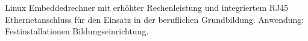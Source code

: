 
Linux Embeddedrechner mit erhöhter Rechenleistung und integriertem RJ45 Ethernetanschluss für den Einsatz in der beruflichen Grundbildung.
Anwendung: Festinstallationen Bildungseinrichtung.
